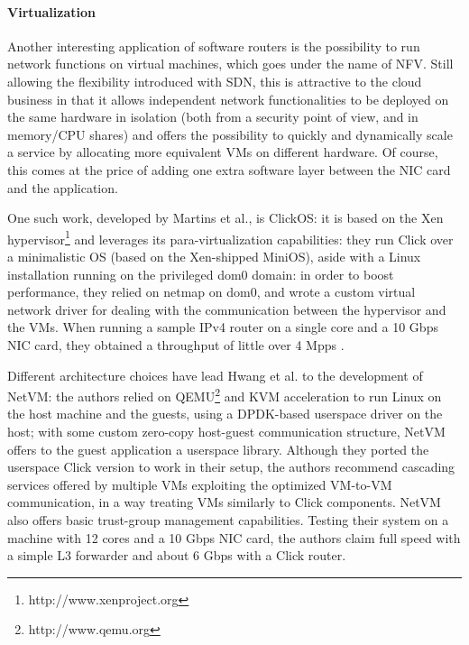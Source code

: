 \documentclass[12pt,a4paper,twoside]{book}
\begin{document}
\paragraph{Virtualization} Another interesting application of software routers is the possibility to run network functions on virtual machines, which goes under the name of \acrfull{NFV}.
Still allowing the flexibility introduced with \gls{SDN}, this is attractive to the cloud business in that it allows independent network functionalities to be deployed on the same hardware in isolation (both from a security point of view, and in memory/CPU shares) and offers the possibility to quickly and dynamically scale a service by allocating more equivalent VMs on different hardware. Of course, this comes at the price of adding one extra software layer between the NIC card and the application.

One such work, developed by Martins et al.\cite{clickos}, is ClickOS: it is based on the Xen hypervisor\footnote{http://www.xenproject.org} and leverages its para-virtualization capabilities: they run Click over a minimalistic OS (based on the Xen-shipped MiniOS), aside with a Linux installation running on the privileged dom0 domain: in order to boost performance, they relied on netmap\cite{netmap} on dom0, and wrote a custom virtual network driver for dealing with the communication between the hypervisor and the VMs. When running a sample IPv4 router on a single core and a 10 Gbps NIC card, they obtained a throughput of little over 4 Mpps .


Different architecture choices have lead Hwang et al. to the development of NetVM\cite{netvm}: the authors relied on QEMU\footnote{http://www.qemu.org} and KVM acceleration to run Linux on the host machine and the guests, using a DPDK-based userspace driver on the host; with some custom zero-copy host-guest communication structure, NetVM offers to the guest application a userspace library. Although they ported the userspace Click version to work in their setup, the authors recommend cascading services offered by multiple VMs exploiting the optimized VM-to-VM communication, in a way treating VMs similarly to Click components. NetVM also offers basic trust-group management capabilities. Testing their system on a machine with 12 cores and a 10 Gbps NIC card, the authors claim full speed with a simple L3 forwarder and about 6 Gbps with a Click router.
\end{document}
